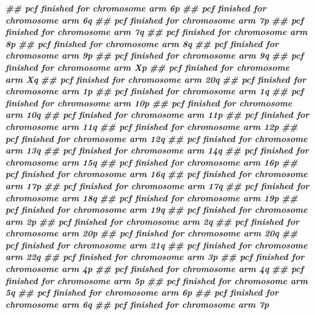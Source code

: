 \documentclass[
  12pt,
  a4paper,
  twoside]{book}
\newenvironment{Shaded}{\begin{snugshade}}{\end{snugshade}}
\newcommand{\DocumentationTok}[1]{\textcolor[rgb]{0.56,0.35,0.01}{\textbf{\textit{#1}}}}
\begin{document}
\begin{Shaded}
\begin{Highlighting}[]
\DocumentationTok{\#\# pcf finished for chromosome arm 6p }
\DocumentationTok{\#\# pcf finished for chromosome arm 6q }
\DocumentationTok{\#\# pcf finished for chromosome arm 7p }
\DocumentationTok{\#\# pcf finished for chromosome arm 7q }
\DocumentationTok{\#\# pcf finished for chromosome arm 8p }
\DocumentationTok{\#\# pcf finished for chromosome arm 8q }
\DocumentationTok{\#\# pcf finished for chromosome arm 9p }
\DocumentationTok{\#\# pcf finished for chromosome arm 9q }
\DocumentationTok{\#\# pcf finished for chromosome arm Xp }
\DocumentationTok{\#\# pcf finished for chromosome arm Xq }
\DocumentationTok{\#\# pcf finished for chromosome arm 20q }
\DocumentationTok{\#\# pcf finished for chromosome arm 1p }
\DocumentationTok{\#\# pcf finished for chromosome arm 1q }
\DocumentationTok{\#\# pcf finished for chromosome arm 10p }
\DocumentationTok{\#\# pcf finished for chromosome arm 10q }
\DocumentationTok{\#\# pcf finished for chromosome arm 11p }
\DocumentationTok{\#\# pcf finished for chromosome arm 11q }
\DocumentationTok{\#\# pcf finished for chromosome arm 12p }
\DocumentationTok{\#\# pcf finished for chromosome arm 12q }
\DocumentationTok{\#\# pcf finished for chromosome arm 13q }
\DocumentationTok{\#\# pcf finished for chromosome arm 14q }
\DocumentationTok{\#\# pcf finished for chromosome arm 15q }
\DocumentationTok{\#\# pcf finished for chromosome arm 16p }
\DocumentationTok{\#\# pcf finished for chromosome arm 16q }
\DocumentationTok{\#\# pcf finished for chromosome arm 17p }
\DocumentationTok{\#\# pcf finished for chromosome arm 17q }
\DocumentationTok{\#\# pcf finished for chromosome arm 18q }
\DocumentationTok{\#\# pcf finished for chromosome arm 19p }
\DocumentationTok{\#\# pcf finished for chromosome arm 19q }
\DocumentationTok{\#\# pcf finished for chromosome arm 2p }
\DocumentationTok{\#\# pcf finished for chromosome arm 2q }
\DocumentationTok{\#\# pcf finished for chromosome arm 20p }
\DocumentationTok{\#\# pcf finished for chromosome arm 20q }
\DocumentationTok{\#\# pcf finished for chromosome arm 21q }
\DocumentationTok{\#\# pcf finished for chromosome arm 22q }
\DocumentationTok{\#\# pcf finished for chromosome arm 3p }
\DocumentationTok{\#\# pcf finished for chromosome arm 4p }
\DocumentationTok{\#\# pcf finished for chromosome arm 4q }
\DocumentationTok{\#\# pcf finished for chromosome arm 5p }
\DocumentationTok{\#\# pcf finished for chromosome arm 5q }
\DocumentationTok{\#\# pcf finished for chromosome arm 6p }
\DocumentationTok{\#\# pcf finished for chromosome arm 6q }
\DocumentationTok{\#\# pcf finished for chromosome arm 7p }

\end{Highlighting}
\end{Shaded}
\end{document}
